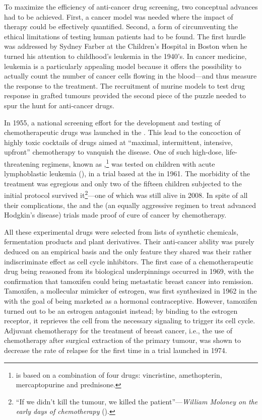 To maximize the efficiency of anti-cancer drug screening, two conceptual
advances had to be achieved.  First, a cancer model was needed where the impact
of therapy could be effectively quantified.  Second, a form of circumventing the
ethical limitations of testing human patients had to be found.  The first hurdle
was addressed by Sydney Farber at the Children's Hospital in Boston when he
turned his attention to childhood's leukemia in the 1940's.  In cancer medicine,
leukemia is a particularly appealing model because it offers the possibility to
actually count the number of cancer cells flowing in the blood---and thus
measure the response to the treatment.  The recruitment of murine models to test
drug response in grafted tumours provided the second piece of the puzzle needed
to spur the hunt for anti-cancer drugs.\cite{clowes_further_1905}

In 1955, a national screening effort for the development and testing of
chemotherapeutic drugs was launched in the .  This lead to the
concoction of highly toxic cocktails of drugs aimed at ``maximal, intermittent,
intensive, upfront'' chemotherapy to vanquish the
disease.\cite{frei_curative_1985} One of such high-dose, life-threatening
regimens, known as ,\footnote{ is based on a
  combination of four drugs: vincristine, amethopterin, mercaptopurine and
  prednisone.} was tested on children with acute lymphoblastic leukemia
(), in a trial based at the  in 1961.  The
morbidity of the treatment was egregious and only two of the fifteen children
subjected to the initial protocol survived it\footnote{``If we didn't kill the
  tumour, we killed the patient''---\emph{William Moloney on the early days of
    chemotherapy} (\citealp{moloney_pioneering_1997}).}---one of which was still
alive in 2008.\cite{mukherjee_emperor_2011} In spite of all their complications,
the \cite{frei_effectiveness_1965} and the
\cite{devita_combination_1970} (an equally aggressive regimen to
treat advanced Hodgkin's disease) trials made proof of cure of cancer by
chemotherapy.

All these experimental drugs were selected from lists of synthetic chemicals,
fermentation products and plant derivatives.  Their anti-cancer ability was
purely deduced on an empirical basis and the only feature they shared was their
rather indiscriminate effect as cell cycle inhibitors.  The first case of a
chemotherapeutic drug being reasoned from its biological underpinnings occurred
in 1969, with the confirmation that tamoxifen could bring metastatic breast
cancer into remission.\cite{cole_new_1971} Tamoxifen, a mollecular mimicker of
estrogen, was first synthesized in 1962 in the  with the goal of
being marketed as a hormonal contraceptive.  However, tamoxifen turned out to be
an estrogen antagonist instead; by binding to the estrogen receptor, it
reprieves the cell from the necessary signaling to trigger its cell cycle.
Adjuvant chemotherapy for the treatment of breast cancer, i.e., the use of
chemotherapy after surgical extraction of the primary tumour, was shown to
decrease the rate of relapse for the first time in a trial launched in
1974.\cite{bonadonna_combination_1976}

